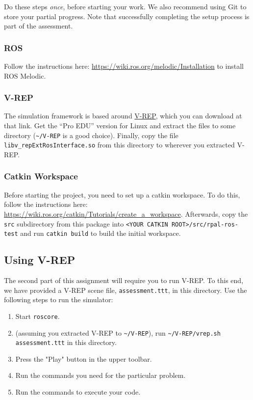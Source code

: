 \documentclass[11pt]{article}
\begin{document}
Do these steps \emph{once}, before starting your work. We also recommend using Git to store your
partial progress. Note that successfully completing the setup process is part of the assessment.

\subsubsection{ROS}

Follow the instructions here: \url{https://wiki.ros.org/melodic/Installation} to install ROS
Melodic.

\subsubsection{V-REP}

The simulation framework is based around
\href{http://www.coppeliarobotics.com/downloads.html}{V-REP}, which you can download at that link.
Get the ``Pro EDU'' version for Linux and extract the files to some directory
(\texttt{\textasciitilde/V-REP} is a good choice). Finally, copy the file
\texttt{libv\_repExtRosInterface.so} from this directory to wherever you extracted V-REP.

\subsubsection{Catkin Workspace}

Before starting the project, you need to set up a catkin workspace. To do this, follow the
instructions here: \url{https://wiki.ros.org/catkin/Tutorials/create_a_workspace}. Afterwards, copy
the \texttt{src} subdirectory from this package into \texttt{<YOUR CATKIN ROOT>/src/rpal-ros-test}
and run \texttt{catkin build} to build the initial workspace.

\subsection{Using V-REP}

The second part of this assignment will require you to run V-REP. To this end, we have provided a
V-REP scene file, \texttt{assessment.ttt}, in this directory. Use the following steps to run the
simulator:
\begin{enumerate}
  \item Start \texttt{roscore}.
  \item (assuming you extracted V-REP to \texttt{\textasciitilde/V-REP}), run
  \texttt{\textasciitilde/V-REP/vrep.sh assessment.ttt} in this directory.
  \item Press the "Play" button in the upper toolbar.
  \item Run the commands you need for the particular problem.
  \item Run the commands to execute your code.
\end{enumerate}  
\end{document}
